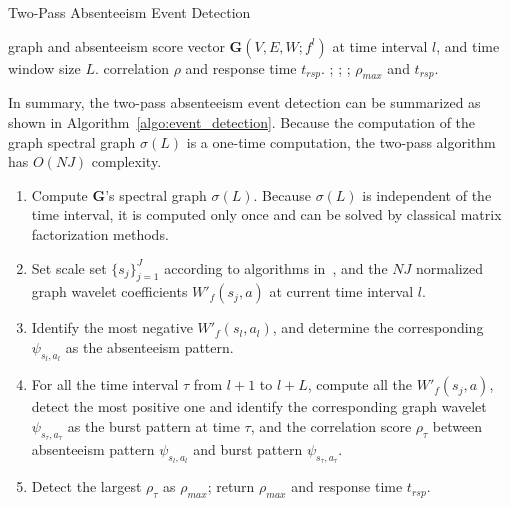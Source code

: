 \begin{algorithm}[t]
\centering
\captionsetup{font=scriptsize}
\caption{Two-Pass Absenteeism Event Detection}
{\footnotesize \begin{algorithmic}[1]
 graph and absenteeism score vector $\mathbf{G}(V,E,W;f^l)$ at time interval $l$, and time window size $L$.
 correlation $\rho$ and response time $t_{rsp}$.	
;
;
;
	\ENDFOR	
{}
\RETURN $\rho_{max}$ and $t_{rsp}$.
\end{algorithmic}}
\label{algo:event_detection}
\end{algorithm}
In summary, the two-pass absenteeism event detection can be summarized as shown in Algorithm~\ref{algo:event_detection}. Because the computation of the graph spectral graph $\sigma(L)$ is a one-time computation, the two-pass algorithm has $O(NJ)$ complexity.
\vspace{-2mm}
\begin{enumerate}
\item Compute $\mathbf{G}$'s spectral graph $\sigma(L)$. Because $\sigma(L)$ is independent of the time interval, it is computed only once and can be solved by classical matrix factorization methods.
\item Set scale set $\{s_j\}_{j=1}^J$ according to algorithms in~\cite{hammond2011wavelets}, and the $NJ$ normalized graph wavelet coefficients $W'_f(s_j, a)$ at current time interval $l$.
\item Identify the most negative $W'_f(s_l, a_l)$, and determine the corresponding $\psi_{s_l,a_l}$ as the absenteeism pattern.
\item For all the time interval $\tau$ from $l+1$ to $l+L$, compute all the $W'_f(s_j, a)$, detect the most positive one and identify the corresponding graph wavelet $\psi_{s_\tau,a_\tau}$ as the burst pattern at time $\tau$, and the correlation score $\rho_{\tau}$ between absenteeism pattern $\psi_{s_l,a_l}$ and burst pattern $\psi_{s_\tau,a_\tau}$.
\item Detect the largest $\rho_{\tau}$ as $\rho_{max}$; return $\rho_{max}$ and response time $t_{rsp}$.
\end{enumerate}





